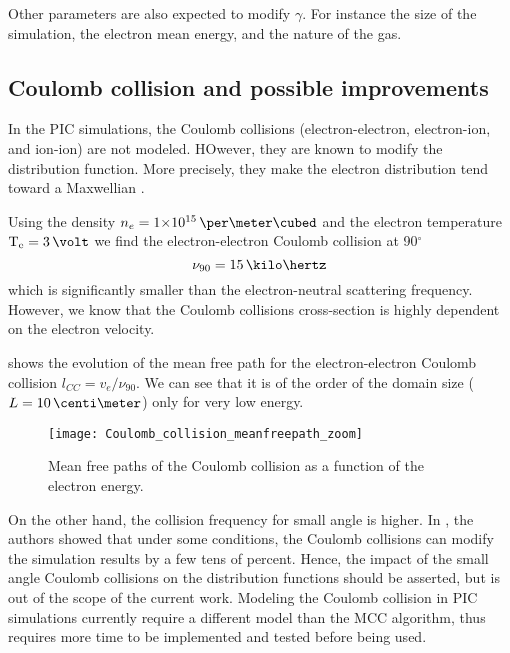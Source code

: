     Other parameters are also expected to modify $\gamma$.
    For instance the size of the simulation, the electron mean energy, and the nature of the gas.

  \subsection{Coulomb collision and possible improvements}
  
    In the \ac{PIC} simulations, the Coulomb collisions (electron-electron, electron-ion, and ion-ion) are not modeled.
    HOwever, they are known to modify the distribution function.
    More precisely, they make the electron distribution tend toward a Maxwellian \citep{bhatnagar1954,sydorenko2006b}.
    
     Using the density $n_e=\sn{1}{15}\,\per\meter\cubed$ and the electron temperature $\Te=3\,\volt$ we find the electron-electron Coulomb collision at 90$^{\circ}$ \citep{lieberman2005,chen2006}
     \begin{equation} \label{eq-nu_Coulomb}
       \nu_{90} = 15 \,\kilo\hertz
     \end{equation}
     which is significantly smaller than the electron-neutral scattering frequency.
     However, we know that the Coulomb collisions cross-section is highly dependent on the electron velocity.
     
      shows the evolution of the mean free path for the electron-electron Coulomb collision $l_{CC} = v_e/\nu_{90}$.
     We can see that it is of the order of the domain size ($L=10\,\centi\meter$) only for very low energy.
     \begin{figure}[hbtp]
       \centering
       \texttt{[image: Coulomb\_collision\_meanfreepath\_zoom]}
       \caption{Mean free paths of the Coulomb collision as a function of the electron energy.}
       \label{fig-mfp_coulomb}
     \end{figure}
     
     On the other hand, the collision frequency for small angle is higher.
     In \citet{sydorenko2006b}, the authors showed that under some conditions, the Coulomb collisions can modify the simulation results by a few tens of percent.
     Hence, the impact of the small angle Coulomb collisions on the distribution functions should be asserted, but is out of the scope of the current work.
     Modeling the Coulomb collision in \ac{PIC} simulations currently require a different model than the \ac{MCC} algorithm, thus requires more time to be implemented and tested before being used.

     
